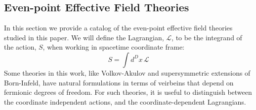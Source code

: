 \documentclass[11pt,letter]{article}
\def\dj#1{{\color{NUpurple}\it \bf JJ: #1}}
\begin{document}
\subsection{Even-point Effective Field Theories}
\label{subsec:EPEFTReview}
\iffalse
 provide some background on the even-point effective field theories that we study in detail in this paper. Typically the power of effective field theory is in its ability to parameterize our ignorance of  hidden UV dynamics in, {a priori}, unconstrained Wilson coefficients -- constrained by comparison to data in either the UV theory or experimental measurement. Throughout the text we will focus on theories whose Wilson coefficients are dictated by symmetry. \dj{This sentence is a little wierd -- usually you think of EFTs as writing down all operators consistent with the symmetries of the physics you're interested in. }  


In what follows, we
\fi
In this section we provide a catalog of the even-point effective field theories studied in this paper. We will define the Lagrangian, $\mathcal{L}$, to be the integrand of the action, $S$, when working in spacetime coordinate frame:
\begin{equation}
S= \int d^D x \,\mathcal{L}
\end{equation}
Some theories in this work, like Volkov-Akulov and supersymmetric extensions of Born-Infeld, have natural formulations in terms of veirbeins that depend on fermionic degrees of freedom. For such theories, it is useful to distinguish between the coordinate independent actions, and the coordinate-dependent Lagrangians. 
\end{document}

